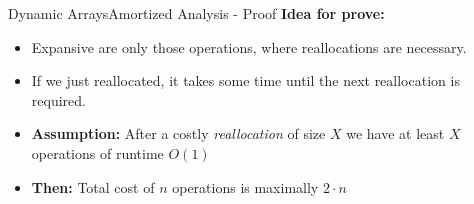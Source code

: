\begin{frame}{Dynamic Arrays}{Amortized Analysis - Proof}
  \textbf{Idea for prove:}
  \begin{itemize}
    \item
      Expansive are only those operations, where reallocations are necessary.
    \item
      If we just reallocated, it takes some time until the next reallocation is required.
    \item \textbf{Assumption:}
      After a costly \textit{reallocation} of size $X$ we have at least $X$ operations of runtime $O(1)$
    \item
      \textbf{Then:} Total cost of {\color{Mittel-Blau}$n$} operations is maximally {\color{Mittel-Blau}$2 \cdot n$}
  \end{itemize}
\end{frame}


